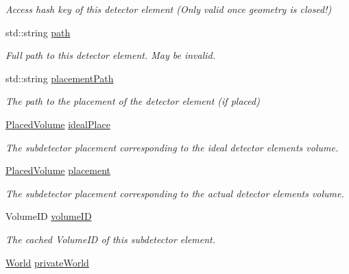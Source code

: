 \begin{DoxyCompactItemize}
\begin{DoxyCompactList}\small\item\em Access hash key of this detector element (Only valid once geometry is closed!) \end{DoxyCompactList}\item 
std\+::string \hyperlink{class_d_d4hep_1_1_geometry_1_1_det_element_object_a6346cce7b6b1f96a5f33a41f2f9e219f}{path}
\begin{DoxyCompactList}\small\item\em Full path to this detector element. May be invalid. \end{DoxyCompactList}\item 
std\+::string \hyperlink{class_d_d4hep_1_1_geometry_1_1_det_element_object_a64bf695379c82abca8e8054307a94861}{placement\+Path}
\begin{DoxyCompactList}\small\item\em The path to the placement of the detector element (if placed) \end{DoxyCompactList}\item 
\hyperlink{class_d_d4hep_1_1_geometry_1_1_placed_volume}{Placed\+Volume} \hyperlink{class_d_d4hep_1_1_geometry_1_1_det_element_object_a343542db3151374647357978d11b9b68}{ideal\+Place}
\begin{DoxyCompactList}\small\item\em The subdetector placement corresponding to the ideal detector element\textquotesingle{}s volume. \end{DoxyCompactList}\item 
\hyperlink{class_d_d4hep_1_1_geometry_1_1_placed_volume}{Placed\+Volume} \hyperlink{class_d_d4hep_1_1_geometry_1_1_det_element_object_a7ee03e0b36f123f1ae48fda184303c2a}{placement}
\begin{DoxyCompactList}\small\item\em The subdetector placement corresponding to the actual detector element\textquotesingle{}s volume. \end{DoxyCompactList}\item 
Volume\+ID \hyperlink{class_d_d4hep_1_1_geometry_1_1_det_element_object_a276f203e5b02da612f42450767bf9756}{volume\+ID}
\begin{DoxyCompactList}\small\item\em The cached Volume\+ID of this subdetector element. \end{DoxyCompactList}\item 
\hyperlink{class_d_d4hep_1_1_geometry_1_1_world}{World} \hyperlink{class_d_d4hep_1_1_geometry_1_1_det_element_object_ace2a84b1e32a5263768b573df15d69ff}{private\+World}

\end{DoxyCompactItemize}
